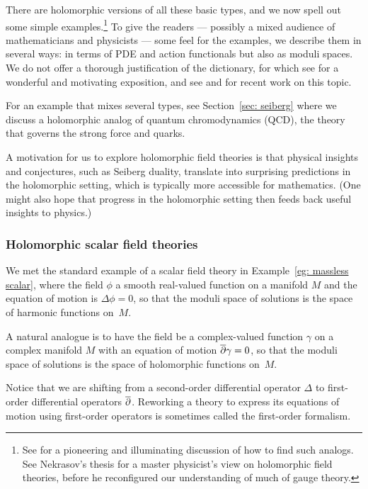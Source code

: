\documentclass[11pt]{amsart}
\begin{document}
There are holomorphic versions of all these basic types, 
and we now spell out some simple examples.\footnote{See \cite{DonThom} for a pioneering and illuminating discussion of how to find such analogs. See Nekrasov's thesis \cite{NekThesis} for a master physicist's view on holomorphic field theories, before he  reconfigured our understanding of much of gauge theory.}
To give the readers --- possibly a mixed audience of mathematicians and physicists --- some feel for the examples, 
we describe them in several ways: 
in terms of PDE and action functionals but also as moduli spaces.
We do not offer a thorough justification of the dictionary, for which see \cite{CosSUSY} for a wonderful and motivating exposition,
and see \cite{AlfonsiYoung} and \cite{Steffens23} for recent work on this topic.

For an example that mixes several types, see Section~\ref{sec: seiberg}
where we discuss a holomorphic analog of quantum chromodynamics (QCD), the theory that governs the strong force and quarks.

A motivation for us to explore holomorphic field theories is that physical insights and conjectures, such as Seiberg duality, translate into surprising predictions in the holomorphic setting,
which is typically more accessible for mathematics.
(One might also hope that progress in the holomorphic setting then feeds back useful insights to physics.)

\subsubsection{Holomorphic scalar field theories}

We met the standard example of a scalar field theory in Example~\ref{eg: massless scalar},
where the field $\phi$ a smooth real-valued function on a manifold $M$
and the equation of motion is $\Delta \phi = 0$,
so that the moduli space of solutions is the space of harmonic functions on~$M$.

A natural analogue is to have the field be a complex-valued function $\gamma$ on a complex manifold $M$ with an equation of motion ${\overline{\partial}} \gamma = 0$,
so that the moduli space of solutions is the space of holomorphic functions on~$M$.

Notice that we are shifting from a second-order differential operator $\Delta$ to first-order differential operators ${\overline{\partial}}$.
Reworking a theory to express its equations of motion using first-order operators is sometimes called the first-order formalism.
\end{document}
